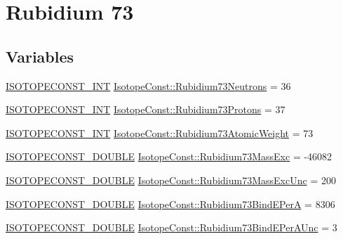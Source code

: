 \hypertarget{group___isotope_const-_rubidium-_rb73}{}\section{Rubidium 73}
\label{group___isotope_const-_rubidium-_rb73}
\subsection*{Variables}
\begin{DoxyCompactItemize}
\item 
\mbox{\hyperlink{group___isotope_const-_macros_ga5f18360b3e99483a35c32d789e62621c}{I\+S\+O\+T\+O\+P\+E\+C\+O\+N\+S\+T\+\_\+\+I\+NT}} \mbox{\hyperlink{group___isotope_const-_rubidium-_rb73_ga3c32912469bf1e3d3f52b624fed87a24}{Isotope\+Const\+::\+Rubidium73\+Neutrons}} = 36
\item 
\mbox{\hyperlink{group___isotope_const-_macros_ga5f18360b3e99483a35c32d789e62621c}{I\+S\+O\+T\+O\+P\+E\+C\+O\+N\+S\+T\+\_\+\+I\+NT}} \mbox{\hyperlink{group___isotope_const-_rubidium-_rb73_gae99d0713df0c3828a8817dccaf2ce230}{Isotope\+Const\+::\+Rubidium73\+Protons}} = 37
\item 
\mbox{\hyperlink{group___isotope_const-_macros_ga5f18360b3e99483a35c32d789e62621c}{I\+S\+O\+T\+O\+P\+E\+C\+O\+N\+S\+T\+\_\+\+I\+NT}} \mbox{\hyperlink{group___isotope_const-_rubidium-_rb73_ga2e3687528753fd94ea572db4dde2e2ef}{Isotope\+Const\+::\+Rubidium73\+Atomic\+Weight}} = 73
\item 
\mbox{\hyperlink{group___isotope_const-_macros_ga8f45a7272ce02c0b4c65c44636ed719a}{I\+S\+O\+T\+O\+P\+E\+C\+O\+N\+S\+T\+\_\+\+D\+O\+U\+B\+LE}} \mbox{\hyperlink{group___isotope_const-_rubidium-_rb73_ga78386f5358c09644dfafeb2c2af73daf}{Isotope\+Const\+::\+Rubidium73\+Mass\+Exc}} = -\/46082
\item 
\mbox{\hyperlink{group___isotope_const-_macros_ga8f45a7272ce02c0b4c65c44636ed719a}{I\+S\+O\+T\+O\+P\+E\+C\+O\+N\+S\+T\+\_\+\+D\+O\+U\+B\+LE}} \mbox{\hyperlink{group___isotope_const-_rubidium-_rb73_ga5ccef71ae3c3868ae349805f8e704de0}{Isotope\+Const\+::\+Rubidium73\+Mass\+Exc\+Unc}} = 200
\item 
\mbox{\hyperlink{group___isotope_const-_macros_ga8f45a7272ce02c0b4c65c44636ed719a}{I\+S\+O\+T\+O\+P\+E\+C\+O\+N\+S\+T\+\_\+\+D\+O\+U\+B\+LE}} \mbox{\hyperlink{group___isotope_const-_rubidium-_rb73_gac5473b1bf6ddb4e0b39eb5a145df4254}{Isotope\+Const\+::\+Rubidium73\+Bind\+E\+PerA}} = 8306
\item 
\mbox{\hyperlink{group___isotope_const-_macros_ga8f45a7272ce02c0b4c65c44636ed719a}{I\+S\+O\+T\+O\+P\+E\+C\+O\+N\+S\+T\+\_\+\+D\+O\+U\+B\+LE}} \mbox{\hyperlink{group___isotope_const-_rubidium-_rb73_gaf5daf415df78436bbbdd22df890b263e}{Isotope\+Const\+::\+Rubidium73\+Bind\+E\+Per\+A\+Unc}} = 3

\end{DoxyCompactItemize}
